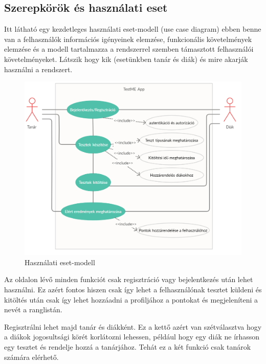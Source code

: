 
\subsection{Szerepkörök és használati eset}

Itt látható egy kezdetleges használati eset-modell (use case diagram) ebben benne van a felhasználók információs igényeinek elemzése, funkcionális követelmények elemzése és a modell tartalmazza a rendszerrel szemben támasztott felhasználói követelményeket.
Látszik hogy kik (esetünkben tanár és diák) és mire akarják használni a rendszert.

\begin{figure}[h]
    \centering
    \includegraphics[width=12cm]{images/use_case.png}
    \caption{Használati eset-modell}
\end{figure}

\vspace{5mm}

Az oldalon lévő minden funkciót csak regisztráció vagy bejelentkezés után lehet használni. Ez azért fontos hiszen csak így lehet a felhasználónak tesztet küldeni és kitöltés után csak így lehet hozzáadni a profiljához a pontokat és megjeleníteni a nevét a ranglistán.

\vspace{5mm}

\noindent Regisztrálni lehet majd tanár és diákként. Ez a kettő azért van szétválasztva hogy a diákok jogosultsági körét korlátozni lehessen, például hogy egy diák ne írhasson egy tesztet és rendelje hozzá a tanárjához. Tehát ez a két funkció csak tanárok számára elérhető.

